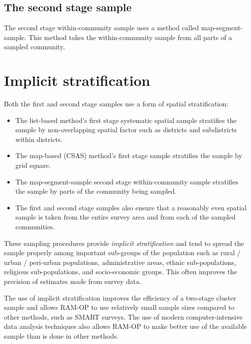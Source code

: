 \documentclass[12pt,a4paper]{book}
\theoremstyle{definition}
\theoremstyle{definition}
\theoremstyle{definition}
\theoremstyle{remark}
\begin{document}
\hypertarget{the-second-stage-sample}{%
\subsection{The second stage sample}\label{the-second-stage-sample}}

The second stage within-community sample uses a method called
map-segment-sample. This method takes the within-community sample from
all parts of a sampled community.

\hypertarget{implicit-stratification}{%
\section{Implicit stratification}\label{implicit-stratification}}

Both the first and second stage samples use a form of spatial
stratification:

\begin{itemize}
\item
  The list-based method's first stage systematic spatial sample
  stratifies the sample by non-overlapping spatial factor such as
  districts and subdistricts within districts.
\item
  The map-based (CSAS) method's first stage sample stratifies the sample
  by grid square.
\item
  The map-segment-sample second stage within-community sample stratifies
  the sample by parts of the community being sampled.
\item
  The first and second stage samples also ensure that a reasonably even
  spatial sample is taken from the entire survey area and from each of
  the sampled communities.
\end{itemize}

These sampling procedures provide \emph{implicit stratification} and
tend to spread the sample properly among important sub-groups of the
population such as rural / urban / peri-urban populations,
administrative areas, ethnic sub-populations, religious sub-populations,
and socio-economic groups. This often improves the precision of
estimates made from survey data.

The use of implicit stratification improves the efficiency of a
two-stage cluster sample and allows RAM-OP to use relatively small
sample sizes compared to other methods, such as SMART surveys. The use
of modern computer-intensive data analysis techniques also allows RAM-OP
to make better use of the available sample than is done in other
methods.
\end{document}
